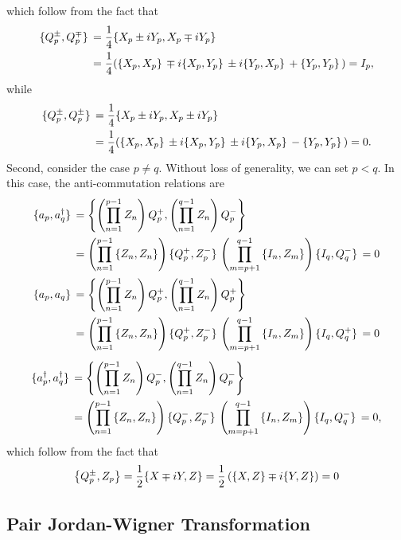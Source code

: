 \documentclass[Dual]{msu-thesis}
\begin{document}
which follow from the fact that
\begin{align}
\acomm*{Q^{\pm}_p}{Q^{\mp}_p}
&=
\frac{1}{4}\acomm*{X_p \pm iY_p}{X_p \mp iY_p}
\nonumber
\\
&=
\frac{1}{4}(\acomm*{X_p}{X_p} \mp i\acomm*{X_p}{Y_p} \pm i\acomm*{Y_p}{X_p}+\acomm*{Y_p}{Y_p})
=I_p
,\end{align}
while
\begin{align}
\acomm*{Q^{\pm}_p}{Q^{\pm}_p}
&=
\frac{1}{4}\acomm*{X_p \pm iY_p}{X_p \pm iY_p}
\nonumber
\\
&=
\frac{1}{4}(\acomm*{X_p}{X_p} \pm i\acomm*{X_p}{Y_p} \pm i\acomm*{Y_p}{X_p}-\acomm*{Y_p}{Y_p})
=0
.\end{align}
Second, consider the case $p\neq q$. Without loss of generality, we can set $p<q$. In this case, the anti-commutation relations are
\begin{align}
\acomm*{a_p}{a^\dagger_q}
&=
\acomm{\left(\prod_{n=1}^{p-1}Z_n\right)Q^+_p}{\left(\prod_{n=1}^{q-1}Z_n\right)Q^-_p}
\\
&=
\left(\prod_{n=1}^{p-1}\acomm{Z_n}{Z_n}\right)
\acomm*{Q^+_p}{Z^-_p}
\left(\prod_{m=p+1}^{q-1}\acomm{I_n}{Z_m}\right)
\acomm*{I_q}{Q^-_q}
=
0
\\
\acomm*{a_p}{a_q}
&=
\acomm{\left(\prod_{n=1}^{p-1}Z_n\right)Q^+_p}{\left(\prod_{n=1}^{q-1}Z_n\right)Q^+_p}
\\
&=
\left(\prod_{n=1}^{p-1}\acomm{Z_n}{Z_n}\right)
\acomm*{Q^+_p}{Z^-_p}
\left(\prod_{m=p+1}^{q-1}\acomm{I_n}{Z_m}\right)
\acomm*{I_q}{Q^+_q}
=
0
\end{align}
\begin{align}
\acomm*{a^\dagger_p}{a^\dagger_q}
&=
\acomm{\left(\prod_{n=1}^{p-1}Z_n\right)Q^-_p}{\left(\prod_{n=1}^{q-1}Z_n\right)Q^-_p}
\\
&=
\left(\prod_{n=1}^{p-1}\acomm{Z_n}{Z_n}\right)
\acomm*{Q^-_p}{Z^-_p}
\left(\prod_{m=p+1}^{q-1}\acomm{I_n}{Z_m}\right)
\acomm*{I_q}{Q^-_q}
=
0
,\end{align}
which follow from the fact that
\begin{align}
\acomm{Q^{\pm}_p}{Z_p}=\frac{1}{2}\acomm{X \mp iY}{Z}
=\frac{1}{2}\left(\acomm{X}{Z}\mp i\acomm{Y}{Z}\right)=0
\end{align}

\subsection{Pair Jordan-Wigner Transformation}
\end{document}
